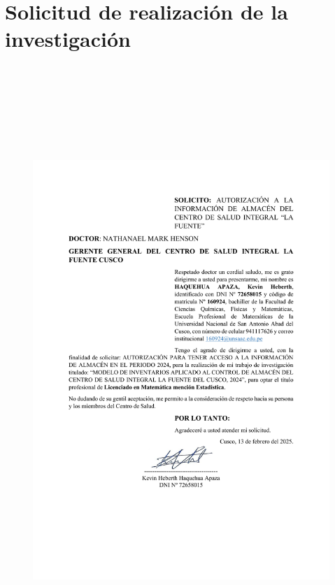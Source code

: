 \section{Solicitud de realización de la investigación}
\begin{figure}[H]
  {\includegraphics[width=17cm, height=23cm, trim=2cm 4cm 1.5cm 2cm, clip]{images/SOLICITUD.pdf}}
\end{figure}

